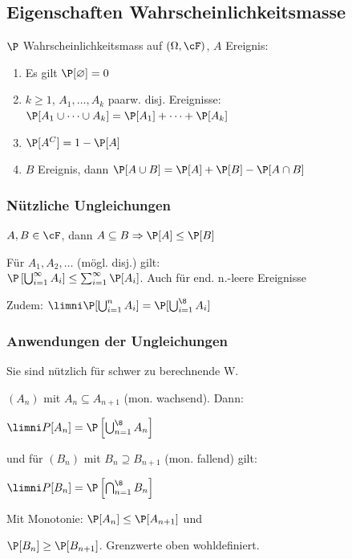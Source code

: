 \subsection{Eigenschaften Wahrscheinlichkeitsmasse}
\shorttheorem $\P$ Wahrscheinlichkeitsmass auf $(\Omega, \cF)$, $A$ Ereignis:
\begin{enumerate}[label=\textbf{E\arabic*.}]
    \item Es gilt $\P[\varnothing] = 0$
    \item {} $k \geq 1$, $A_1, \ldots, A_k$ paarw. disj. Ereignisse:\\
          $\P[A_1 \cup \dots \cup A_k] = \P[A_1] + \dots + \P[A_k]$
    \item $\P[A^C] = 1 - \P[A]$
    \item $B$ Ereignis, dann $\P[A \cup B] = \P[A] + \P[B] - \P[A \cap B]$
\end{enumerate}

\subsubsection{Nützliche Ungleichungen}
\shorttheorem[Monot.] $A, B \in \cF$, dann $A \subseteq B \Rightarrow \P[A] \leq \P[B]$

 Für $A_1, A_2, \ldots$ (mögl. disj.) gilt:\\
$\P\left[ \bigcup_{i = 1}^\infty A_i \right] \leq \sum_{i = 1}^{\infty} \P[A_i]$.
Auch für end. n.-leere Ereignisse

Zudem: $\limni \P[\bigcup_{i = 1}^n A_i] = \P[\bigcup_{i = 1}^\8 A_i]$


\newpage
{}
\subsubsection{Anwendungen der Ungleichungen}
Sie sind nützlich für schwer zu berechnende W.

\shorttheorem $(A_n)$ mit $A_n \subseteq A_{n + 1}$ (mon. wachsend). Dann:

{\centering $\limni P[A_n] = \P\left[ \bigcup_{n = 1}^\8 A_n \right]$\\}

und für $(B_n)$ mit $B_n \supseteq B_{n + 1}$ (mon. fallend) gilt:

{\centering $\limni P[B_n] = \P\left[ \bigcap_{n = 1}^\8 B_n \right]$\\}

\shortremark Mit Monotonie: $\P[A_n] \leq \P[A_{n + 1}]$ und

$\P[B_n] \geq \P[B_{n + 1}]$. Grenzwerte oben wohldefiniert.

